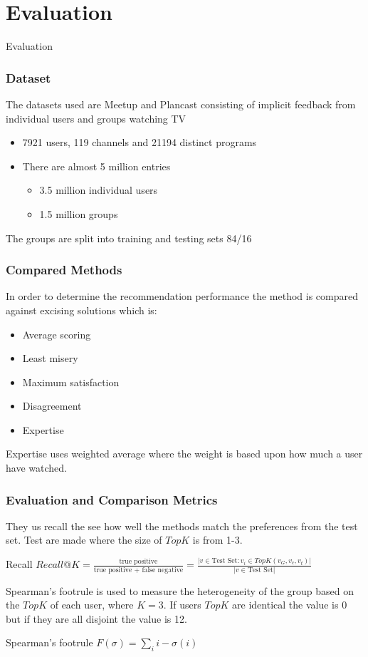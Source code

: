 \section{Evaluation}

\begin{frame}
\begin{center}
     	\huge Evaluation
     \end{center}
\end{frame}

\begin{frame}
	\frametitle{Dataset}
	The datasets used are Meetup and Plancast consisting of implicit feedback from individual users and groups watching TV
	\begin{itemize}
		\item 7921 users, 119 channels and 21194 distinct programs
		\item There are almost 5 million entries 
		\begin{itemize}
			\item 3.5 million individual users
			\item 1.5 million groups
		\end{itemize}
	\end{itemize}
	The groups are split into training and testing sets 84/16%
\end{frame}

\begin{frame}
	\frametitle{Compared Methods}
	In order to determine the recommendation performance the method is compared against excising solutions which is:
	\begin{itemize}
		\item Average scoring
		\item Least misery 
		\item Maximum satisfaction 
		\item Disagreement 
		\item Expertise
	\end{itemize}
	Expertise uses weighted average where the weight is based upon how much a user have watched.
\end{frame}

\begin{frame}
	\frametitle{Evaluation and Comparison Metrics}
	They us recall the see how well the methods match the preferences from the test set. Test are made where the size of $TopK$ is from 1-3.
	\begin{block}{\small Recall}
		\centering
		$Recall@K= \frac{\text{true positive}}{\text{true positive + false negative}} =\frac{| v \in \text{Test Set} : v_i \in TopK(v_G,v_c,v_t)|}{| v \in \text{Test Set}|}$
	\end{block}
	
	Spearman's footrule is used to measure the heterogeneity of the group based on the $TopK$ of each user, where $K=3$. If users $TopK$ are identical the value is 0 but if they are all disjoint the value is 12.

	\begin{block}{\small Spearman's footrule}
		\centering
		$F(\sigma)=\sum_{i}i - \sigma(i)$
	\end{block}	
	
\end{frame}


